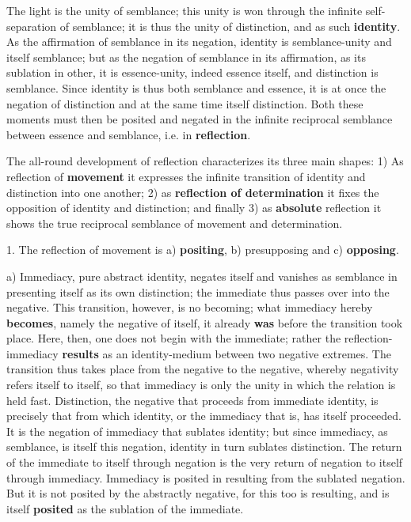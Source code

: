 \documentclass[12pt,a4paper,openany]{book}
\newcommand{\opage}[1]{\marginnote{\footnotesize\textit{[#1]}}}
\begin{document}
The light is the unity of semblance; this unity is won through the infinite self-separation of semblance; it is thus the unity of distinction, and as such \textbf{identity}. As the affirmation of semblance in its negation, identity is semblance-unity and itself semblance; but as the negation of semblance in its affirmation, as its sublation in other, it is essence-unity, indeed essence itself, and distinction is semblance. Since identity is thus both semblance and essence, it is at once the negation of distinction and at the same time itself distinction. Both these
\setcounter{footnote}{0}%
\opage{101}moments must then be posited and negated in the infinite reciprocal semblance between essence and semblance, i.e. in \textbf{reflection}.

The all-round development of reflection characterizes its three main shapes: 1) As reflection of \textbf{movement} it expresses the infinite transition of identity and distinction into one another; 2) as \textbf{reflection of determination} it fixes the opposition of identity and distinction; and finally 3) as \textbf{absolute} reflection it shows the true reciprocal semblance of movement and determination.

1. The reflection of movement is a) \textbf{positing}, b) presupposing and c) \textbf{opposing}.

a) Immediacy, pure abstract identity, negates itself and vanishes as semblance in presenting itself as its own distinction; the immediate thus passes over into the negative. This transition, however, is no becoming; what immediacy hereby \textbf{becomes}, namely the negative of itself, it already \textbf{was} before the transition took place. Here, then, one does not begin with the immediate; rather the reflection-immediacy \textbf{results} as an identity-medium between two negative extremes. The transition thus takes place from the negative to the negative, whereby negativity refers itself to itself, so that immediacy is only the unity in which the relation is held fast. Distinction, the negative that proceeds from immediate identity, is precisely that from which identity, or the immediacy that is, has itself proceeded. It is the negation of immediacy that sublates identity; but since immediacy, as semblance, is itself this negation, identity in turn sublates distinction. The return of the immediate to itself through negation is
\setcounter{footnote}{0}%
\opage{102}the very return of negation to itself through immediacy. Immediacy is posited in resulting from the sublated negation. But it is not posited by the abstractly negative, for this too is resulting, and is itself \textbf{posited} as the sublation of the immediate.
\end{document}
